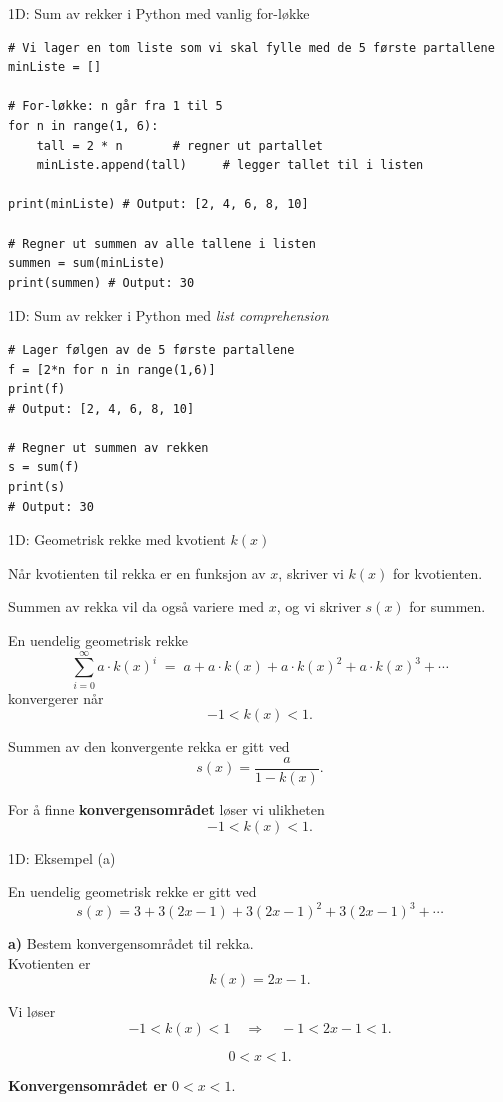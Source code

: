 \blueheader
\begin{frame}[fragile]{1D: Sum av rekker i Python med vanlig for-løkke}
\begin{verbatim}
# Vi lager en tom liste som vi skal fylle med de 5 første partallene
minListe = []

# For-løkke: n går fra 1 til 5
for n in range(1, 6):
    tall = 2 * n       # regner ut partallet
    minListe.append(tall)     # legger tallet til i listen

print(minListe) # Output: [2, 4, 6, 8, 10]

# Regner ut summen av alle tallene i listen
summen = sum(minListe)
print(summen) # Output: 30

\end{verbatim}
\end{frame}



\blueheader
\begin{frame}[fragile]{1D: Sum av rekker i Python med \emph{list comprehension}}
\warn
\begin{verbatim}
# Lager følgen av de 5 første partallene
f = [2*n for n in range(1,6)]
print(f)
# Output: [2, 4, 6, 8, 10]

# Regner ut summen av rekken
s = sum(f)
print(s)
# Output: 30
\end{verbatim}
\end{frame}




\redheader
\begin{frame}{1D: Geometrisk rekke med kvotient $k(x)$}

Når kvotienten til rekka er en funksjon av $x$, skriver vi $k(x)$ for kvotienten.  

\medskip
Summen av rekka vil da også variere med $x$, og vi skriver $s(x)$ for summen.  

\medskip
En uendelig geometrisk rekke
\[
\sum_{i=0}^{\infty} a \cdot k(x)^i \;=\; a + a\cdot k(x) + a\cdot k(x)^2 + a\cdot k(x)^3 + \cdots
\]
konvergerer når
\[
-1 < k(x) < 1.
\]

Summen av den konvergente rekka er gitt ved
\[
s(x) = \frac{a}{1-k(x)}.
\]

\medskip
For å finne \textbf{konvergensområdet} løser vi ulikheten
\[
-1 < k(x) < 1.
\]

\end{frame}

\greenheader
\begin{frame}{1D: Eksempel (a)}

En uendelig geometrisk rekke er gitt ved
\[
s(x) = 3 + 3(2x-1) + 3(2x-1)^2 + 3(2x-1)^3 + \cdots
\]

\textbf{a)} Bestem konvergensområdet til rekka.\\

\medskip
Kvotienten er 
\[
k(x) = 2x - 1.
\]

Vi løser
\[
-1 < k(x) < 1 \quad \Longrightarrow \quad -1 < 2x-1 < 1.
\]

\[
0 < x < 1.
\]

\textbf{Konvergensområdet er } $0 < x < 1$.
\end{frame}


